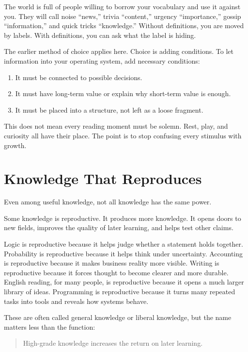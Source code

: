 The world is full of people willing to borrow your vocabulary and use it against you. They will call noise ``news,'' trivia ``content,'' urgency ``importance,'' gossip ``information,'' and quick tricks ``knowledge.'' Without definitions, you are moved by labels. With definitions, you can ask what the label is hiding.

The earlier method of choice applies here. Choice is adding conditions. To let information into your operating system, add necessary conditions:

\begin{enumerate}
\item It must be connected to possible decisions.
\item It must have long-term value or explain why short-term value is enough.
\item It must be placed into a structure, not left as a loose fragment.
\end{enumerate}

This does not mean every reading moment must be solemn. Rest, play, and curiosity all have their place. The point is to stop confusing every stimulus with growth.

\section*{Knowledge That Reproduces}

Even among useful knowledge, not all knowledge has the same power.

Some knowledge is reproductive. It produces more knowledge. It opens doors to new fields, improves the quality of later learning, and helps test other claims.

Logic is reproductive because it helps judge whether a statement holds together. Probability is reproductive because it helps think under uncertainty. Accounting is reproductive because it makes business reality more visible. Writing is reproductive because it forces thought to become clearer and more durable. English reading, for many people, is reproductive because it opens a much larger library of ideas. Programming is reproductive because it turns many repeated tasks into tools and reveals how systems behave.

These are often called general knowledge or liberal knowledge, but the name matters less than the function:

\begin{quote}
High-grade knowledge increases the return on later learning.
\end{quote}

